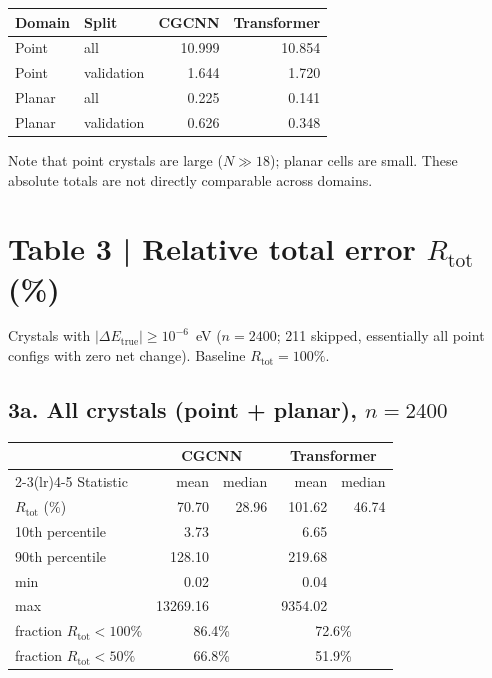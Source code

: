 \documentclass[11pt,a4paper]{article}
\begin{document}
\begin{center}
\small
\begin{tabular}{llrr}
  \toprule
  Domain & Split & CGCNN & Transformer \\
  \midrule
  Point  & all        & 10.999 & 10.854 \\
  Point  & validation &  1.644 &  1.720 \\
  Planar & all        &  0.225 &  0.141 \\
  Planar & validation &  0.626 &  0.348 \\
  \bottomrule
\end{tabular}
\end{center}

Note that point crystals are large ($N\gg 18$); planar cells are small. These absolute totals are not directly comparable across domains.

\section*{Table 3 | Relative total error $R_{\mathrm{tot}}$ (\%)}

Crystals with $|\Delta E_{\mathrm{true}}|\ge10^{-6}$~eV ($n=2400$; 211 skipped, essentially all point configs with zero net change). Baseline $R_{\mathrm{tot}}=100\%$.

\subsection*{3a. All crystals (point + planar), $n=2400$}

\begin{center}
\small
\begin{tabular}{lrrrr}
  \toprule
  & \multicolumn{2}{c}{CGCNN} & \multicolumn{2}{c}{Transformer} \\
  \cmidrule(lr){2-3}\cmidrule(lr){4-5}
  Statistic & mean & median & mean & median \\
  \midrule
  $R_{\mathrm{tot}}$ (\%)     & 70.70 & 28.96 & 101.62 & 46.74 \\
  10th percentile             &  3.73 &       &   6.65 & \\
  90th percentile             & 128.10 &       & 219.68 & \\
  min                         &  0.02 &       &   0.04 & \\
  max                         & 13269.16 &    & 9354.02 & \\
  fraction $R_{\mathrm{tot}}<100\%$ & \multicolumn{2}{c}{86.4\%} & \multicolumn{2}{c}{72.6\%} \\
  fraction $R_{\mathrm{tot}}<50\%$  & \multicolumn{2}{c}{66.8\%} & \multicolumn{2}{c}{51.9\%} \\
  \bottomrule
\end{tabular}
\end{center}
\end{document}
